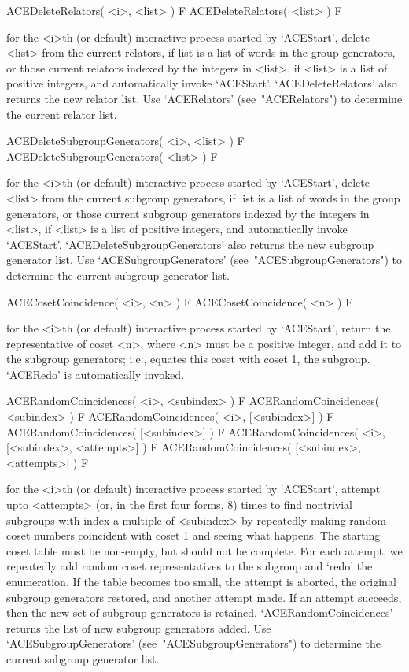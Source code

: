 \>ACEDeleteRelators( <i>, <list> ) F
\>ACEDeleteRelators( <list> ) F

for the <i>th (or  default)  interactive  {\ACE}  process  started  by
`ACEStart', delete <list> from the current relators, if list is a list
of words in the group generators, or those current relators indexed by
the integers in <list>, if <list> is a list of positive integers,  and
automatically invoke `ACEStart'. `ACEDeleteRelators' also returns  the
new relator list. Use `ACERelators' (see~"ACERelators")  to  determine
the current relator list.

\>ACEDeleteSubgroupGenerators( <i>, <list> ) F
\>ACEDeleteSubgroupGenerators( <list> ) F

for the <i>th (or  default)  interactive  {\ACE}  process  started  by
`ACEStart', delete <list> from the  current  subgroup  generators,  if
list is a list of words in the  group  generators,  or  those  current
subgroup generators indexed by the integers in <list>, if <list> is  a
list  of  positive  integers,  and  automatically  invoke  `ACEStart'.
`ACEDeleteSubgroupGenerators' also returns the new subgroup  generator
list.  Use  `ACESubgroupGenerators'  (see~"ACESubgroupGenerators")  to
determine the current subgroup generator list.

\>ACECosetCoincidence( <i>, <n> ) F
\>ACECosetCoincidence( <n> ) F

for the <i>th (or  default)  interactive  {\ACE}  process  started  by
`ACEStart', return the representative of coset <n>, where <n> must  be
a positive integer, and add  it  to  the  subgroup  generators;  i.e.,
equates  this  coset  with  coset  1,  the  subgroup.   `ACERedo'   is
automatically invoked.

\>ACERandomCoincidences( <i>, <subindex> ) F
\>ACERandomCoincidences( <subindex> ) F
\>ACERandomCoincidences( <i>, [<subindex>] ) F
\>ACERandomCoincidences( [<subindex>] ) F
\>ACERandomCoincidences( <i>, [<subindex>, <attempts>] ) F
\>ACERandomCoincidences( [<subindex>, <attempts>] ) F

for the <i>th (or  default)  interactive  {\ACE}  process  started  by
`ACEStart', attempt upto <attempts> (or, in the first four  forms,  8)
times to find nontrivial subgroups with index a multiple of <subindex>
by repeatedly making random coset numbers coincident with coset 1  and
seeing what happens. The starting coset table must be  non-empty,  but
should not be complete. For each attempt,  we  repeatedly  add  random
coset representatives to the subgroup and `redo' the  enumeration.  If
the table becomes too small, the  attempt  is  aborted,  the  original
subgroup generators restored, and another attempt made. If an  attempt
succeeds, then  the  new  set  of  subgroup  generators  is  retained.
`ACERandomCoincidences' returns the list of  new  subgroup  generators
added. Use  `ACESubgroupGenerators'  (see~"ACESubgroupGenerators")  to
determine the current subgroup generator list.

